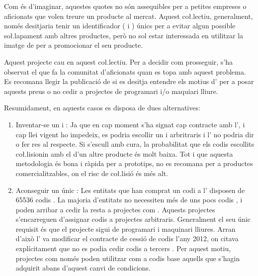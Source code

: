 Com és d'imaginar, aquestes quotes no són assequibles per a petites empreses
o aficionats que volen treure un producte al mercat. Aquest co\l.lectiu,
generalment, només desitjaria tenir un identificador ( i )
únics per a evitar algun possible so\l.lapament amb altres productes, però
no sol estar interessada en utilitzar la imatge de  per a promocionar
el seu producte.

Aquest projecte cau en aquest co\l.lectiu. Per a decidir com prosseguir, s'ha
observat el que fa la comunitat d'aficionats quan es topa amb aquest problema.
Es recomana llegir la publicació de \cite{Johnson2023usb} si es desitja entendre
els motius d' per a posar aquests preus o no cedir 
a projectes de programari i/o maquiari lliure.

Resumidament, en aquests casos es disposa de dues alternatives:

\begin{enumerate}
    \item Inventar-se un  i : Ja que en cap moment s'ha
    signat cap contracte amb l', i cap llei vigent ho impedeix, es
    podria escollir un  i  arbritraris i l' no
    podria dir o fer res al respecte. Si s'escull amb cura, la
    probabilitat que els codis escollits co\l.lisionin amb el d'un altre
    producte és molt baixa. Tot i que aquesta metodologia és bona i ràpida per a
    prototips, no es recomana per a productes comercialitzables, on el risc
    de co\l.lisió és més alt.
    \item Aconseguir un únic : Les entitats que han comprat un codi
     a l' disposen de 65536 codis . La majoria
    d'entitats no necessiten més de uns pocs codis , i poden arribar
    a cedir la resta a projectes com  \cite{OpenMokoUSB}. Aquests
    projectes s'encarreguen d'assignar codis  a projectes arbitraris.
    Generalment el seu únic requisit és que el projecte sigui de programari
    i maquinari lliures. Arran d'això l' va modificar el contracte
    de cessió de codis  l'any 2012, on citava explícitament que no es
    podia cedir codis  a tercers \cite{Johnson2023usb}. Per aquest
    motiu, projectes com  només poden utilitzar com a codis
     base aquells que s'hagin adquirit abans d'aquest canvi
    de condicions.
\end{enumerate}

